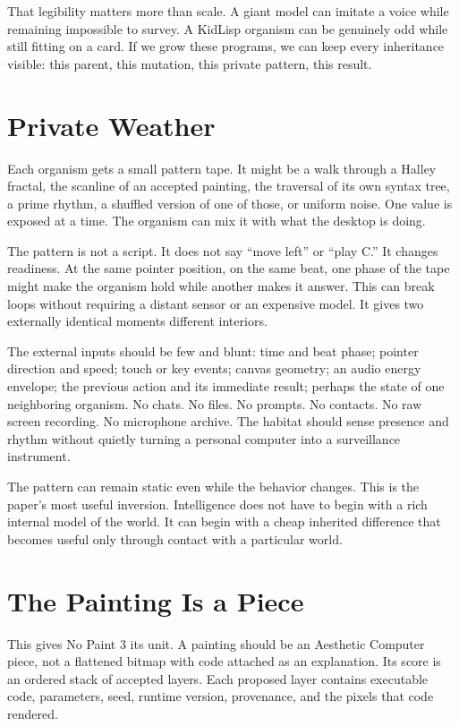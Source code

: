 \documentclass[10pt,letterpaper]{article}
\begin{document}
That legibility matters more than scale. A giant model can imitate a voice while remaining impossible to survey. A KidLisp organism can be genuinely odd while still fitting on a card. If we grow these programs, we can keep every inheritance visible: this parent, this mutation, this private pattern, this result.

\section{Private Weather}

Each organism gets a small pattern tape. It might be a walk through a Halley fractal, the scanline of an accepted painting, the traversal of its own syntax tree, a prime rhythm, a shuffled version of one of those, or uniform noise. One value is exposed at a time. The organism can mix it with what the desktop is doing.

The pattern is not a script. It does not say ``move left'' or ``play C.'' It changes readiness. At the same pointer position, on the same beat, one phase of the tape might make the organism hold while another makes it answer. This can break loops without requiring a distant sensor or an expensive model. It gives two externally identical moments different interiors.

The external inputs should be few and blunt: time and beat phase; pointer direction and speed; touch or key events; canvas geometry; an audio energy envelope; the previous action and its immediate result; perhaps the state of one neighboring organism. No chats. No files. No prompts. No contacts. No raw screen recording. No microphone archive. The habitat should sense presence and rhythm without quietly turning a personal computer into a surveillance instrument.

The pattern can remain static even while the behavior changes. This is the paper's most useful inversion. Intelligence does not have to begin with a rich internal model of the world. It can begin with a cheap inherited difference that becomes useful only through contact with a particular world.

\section{The Painting Is a Piece}

This gives No Paint 3 its unit. A painting should be an Aesthetic Computer piece, not a flattened bitmap with code attached as an explanation. Its score is an ordered stack of accepted layers. Each proposed layer contains executable code, parameters, seed, runtime version, provenance, and the pixels that code rendered.
\end{document}
